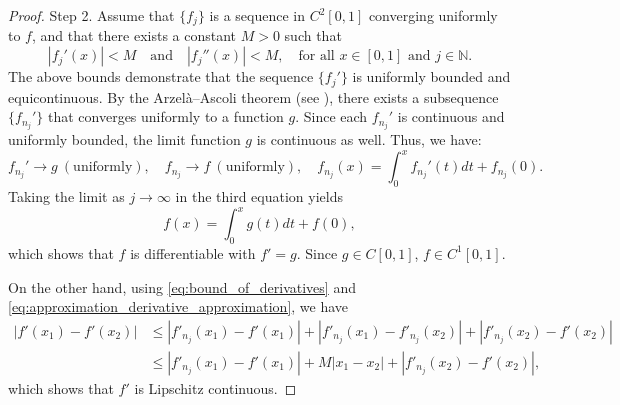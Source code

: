 \documentclass[11pt,reqno]{amsart}
\theoremstyle{definition}
\theoremstyle{remark}
\numberwithin{equation}{section}
\begin{document}
\begin{proof}
Step 2. Assume that $\{f_j\}$ is a sequence in $C^2[0,1]$ converging uniformly to $f$, and that there exists a constant $M > 0$ such that
\begin{equation}\label{eq:bound_of_derivatives}
	|f_j'(x)| < M \quad \text{and} \quad |f_j''(x)| < M, \quad \text{for all } x \in [0,1] \text{ and } j \in \mathbb{N}.
\end{equation}
The above bounds demonstrate that the sequence $\{f_j'\}$ is uniformly bounded and equicontinuous. By the Arzelà--Ascoli theorem (see \cite{Lax14}), there exists a subsequence $\{f_{n_j}'\}$ that converges uniformly to a function $g$. Since each $f_{n_j}'$ is continuous and uniformly bounded, the limit function $g$ is continuous as well. Thus, we have:
\begin{equation}\label{eq:approximation_derivative_approximation}	
		f_{n_j}' \rightarrow g~(\text{uniformly}),\quad
		f_{n_j} \rightarrow f~(\text{uniformly}), \quad
		f_{n_j}(x) = \displaystyle\int_0^x f_{n_j}'(t)  dt + f_{n_j}(0).
\end{equation}
Taking the limit as $j \to \infty$ in the third equation yields
\begin{equation*}
f(x) = \int_0^x g(t)  dt + f(0),
\end{equation*}
which shows that $f$ is differentiable with $f' = g$. Since $g \in C[0,1]$, $f \in C^{1}[0,1]$.
	
On the other hand, using \eqref{eq:bound_of_derivatives} and \eqref{eq:approximation_derivative_approximation}, we have
\begin{equation*}
\begin{aligned}
	\left| f'(x_1) - f'(x_2) \right| & \leq \left| f'_{n_j}(x_1) - f'(x_1) \right| + \left| f'_{n_j}(x_1) - f'_{n_j}(x_2) \right| + \left| f'_{n_j}(x_2) - f'(x_2) \right| \\
	& \leq \left| f'_{n_j}(x_1) - f'(x_1) \right| + M \left| x_1 - x_2 \right| + \left| f'_{n_j}(x_2) - f'(x_2) \right|,
\end{aligned}
\end{equation*}
which shows that $f'$ is Lipschitz continuous.
\end{proof}

\end{document}
